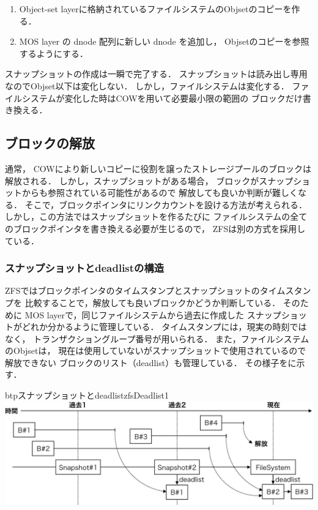 \begin{enumerate}
\item Object-set layerに格納されているファイルシステムのObjsetのコピーを作る．
\item MOS layer の dnode 配列に新しい dnode を追加し，
  Objsetのコピーを参照するようにする．
\end{enumerate}

スナップショットの作成は一瞬で完了する．
スナップショットは読み出し専用なのでObjset以下は変化しない．
しかし，ファイルシステムは変化する．
ファイルシステムが変化した時はCOWを用いて必要最小限の範囲の
ブロックだけ書き換える．

\subsection{ブロックの解放}
通常，
COWにより新しいコピーに役割を譲ったストレージプールのブロックは解放される．
しかし，スナップショットがある場合，
ブロックがスナップショットからも参照されている可能性があるので
解放しても良いか判断が難しくなる．
そこで，ブロックポインタにリンクカウントを設ける方法が考えられる．
しかし，この方法ではスナップショットを作るたびに
ファイルシステムの全てのブロックポインタを書き換える必要が生じるので，
ZFSは別の方式を採用している．

\subsubsection{スナップショットとdeadlistの構造}
ZFSではブロックポインタのタイムスタンプとスナップショットのタイムスタンプを
比較することで，解放しても良いブロックかどうか判断している．
そのために MOS layerで，同じファイルシステムから過去に作成した
スナップショットがどれか分かるように管理している．
タイムスタンプには，現実の時刻ではなく，
トランザクショングループ番号が用いられる．
また，ファイルシステムのObjsetは，
現在は使用していないがスナップショットで使用されているので解放できない
ブロックのリスト（deadlist）も管理している．
その様子をに示す．

\begin{myfig}{btp}{スナップショットとdeadlist}{zfsDeadlist1}
  \centering\includegraphics[scale=0.7]{Fig/zfsDeadlist1-crop.pdf}
\end{myfig}

